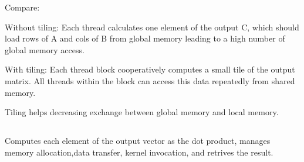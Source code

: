 \documentclass{article}
\begin{document}
Compare:

Without tiling:
Each thread calculates one element of the output C, which should load rows of A and cols of B from global memory leading to a high number of global memory access.

With tiling:
Each thread block cooperatively computes a small tile of the output matrix. All threads within the block can access this data repeatedly from shared memory.

Tiling helps decreasing exchange between global memory and local memory.




\subsection{}%
Computes each element of the output vector as the dot product, manages memory allocation,data transfer, kernel invocation, and retrives the result.
\end{document}
